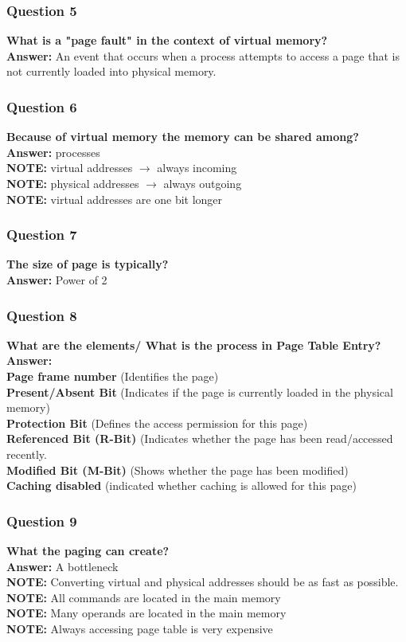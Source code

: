 \documentclass{article}
\begin{document}
\subsubsection*{Question 5}
\textbf{What is a "page fault" in the context of virtual memory?} \\
\textbf{Answer:} An event that occurs when a process attempts to access a page that is not currently loaded into physical memory.

\subsubsection*{Question 6}
\textbf{Because of virtual memory the memory can be shared among?} \\
\textbf{Answer:} processes \\
\textbf{NOTE:} virtual addresses $\rightarrow$ always incoming \\
\textbf{NOTE:} physical addresses $\rightarrow$ always outgoing \\
\textbf{NOTE:} virtual addresses are one bit longer

\subsubsection*{Question 7}
\textbf{The size of page is typically?} \\
\textbf{Answer:} Power of 2

\subsubsection*{Question 8}
\textbf{What are the elements/ What is the process in Page Table Entry?} \\
\textbf{Answer:} \\
\textbf{Page frame number} (Identifies the page) \\
\textbf{Present/Absent Bit} (Indicates if the page is currently loaded in the physical memory) \\
\textbf{Protection Bit} (Defines the access permission for this page) \\
\textbf{Referenced Bit (R-Bit)} (Indicates whether the page has been read/accessed recently. \\
\textbf{Modified Bit (M-Bit)} (Shows whether the page has been modified) \\
\textbf{Caching disabled} (indicated whether caching is allowed for this page)

\subsubsection*{Question 9}
\textbf{What the paging can create?} \\
\textbf{Answer:} A bottleneck \\
\textbf{NOTE:} Converting virtual and physical addresses should be as fast as possible.
\textbf{NOTE:} All commands are located in the main memory \\
\textbf{NOTE:} Many operands are located in the main memory \\
\textbf{NOTE:} Always accessing page table is very expensive
\end{document}

